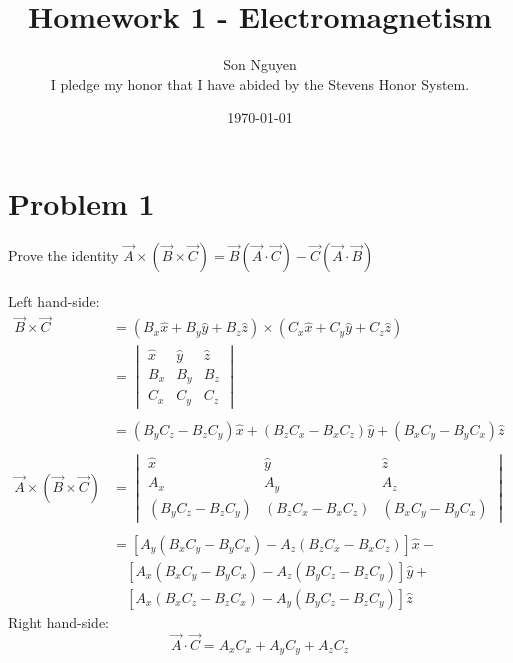 \documentclass[12pt]{article}
\title{Homework 1 - Electromagnetism}
\author{Son Nguyen \\
I pledge my honor that I have abided by the Stevens Honor System.}
\date{\today}
\begin{document}
\maketitle

\section*{Problem 1}
Prove the identity \(\vec{A} \times (\vec{B} \times \vec{C}) = \vec{B} (\vec{A} \cdot \vec{C}) - \vec{C}  (\vec{A} \cdot \vec{B})\) \\ \\
Left hand-side:
\begin{align*}
	\vec{B} \times \vec{C}                  & = (B_x \hat{x} + B_y \hat{y} + B_z \hat{z}) \times (C_x \hat{x} + C_y \hat{y} + C_z \hat{z}) \\
	                                        & = \begin{vmatrix}
		                                            \hat{x} & \hat{y} & \hat{z} \\
		                                            B_x     & B_y     & B_z     \\
		                                            C_x     & C_y     & C_z
	                                            \end{vmatrix}                                                                \\ \\
	                                        & = (B_y C_z - B_z C_y) \hat{x} + (B_z C_x - B_x C_z ) \hat{y} + (B_x C_y - B_y C_x) \hat{z}   \\ \\
	\vec{A} \times (\vec{B} \times \vec{C}) & =
	\begin{vmatrix}
		\hat{x}             & \hat{y}             & \hat{z}             \\
		A_x                 & A_y                 & A_z                 \\
		(B_y C_z - B_z C_y) & (B_z C_x - B_x C_z) & (B_x C_y - B_y C_x)
	\end{vmatrix}                                                                        \\ \\
	                                        & = [A_y(B_x C_y - B_y C_x) - A_z(B_z C_x - B_x C_z)] \hat{x} -                                \\
	                                        & \quad [A_x(B_x C_y - B_y C_x) - A_z(B_y C_z - B_z C_y)] \hat{y} +                            \\
	                                        & \quad [A_x(B_x C_z - B_z C_x) - A_y(B_y C_z - B_z C_y)] \hat{z}
\end{align*}
Right hand-side:
\[\vec{A} \cdot \vec{C} = A_x C_x + A_y C_y + A_z C_z\]
\end{document}
